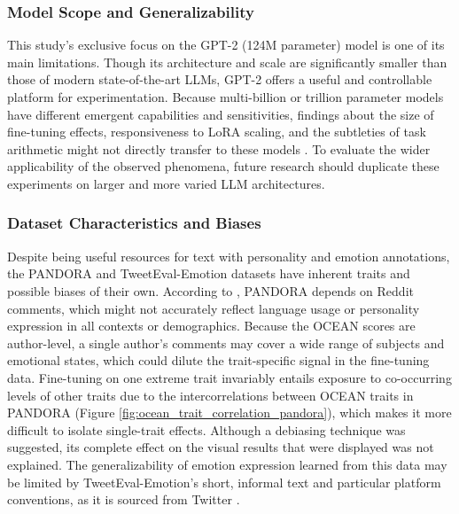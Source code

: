 \documentclass{DESSThesis}
\begin{document}
\subsubsection{Model Scope and Generalizability}
This study's exclusive focus on the GPT-2 (124M parameter) model is one of its main limitations. Though its architecture and scale are significantly smaller than those of modern state-of-the-art LLMs, GPT-2 offers a useful and controllable platform for experimentation. Because multi-billion or trillion parameter models have different emergent capabilities and sensitivities, findings about the size of fine-tuning effects, responsiveness to LoRA scaling, and the subtleties of task arithmetic might not directly transfer to these models \cite{chang_language_2023, safdari_personality_2023, bodroza_personality_2024}. To evaluate the wider applicability of the observed phenomena, future research should duplicate these experiments on larger and more varied LLM architectures.

\subsubsection{Dataset Characteristics and Biases}
Despite being useful resources for text with personality and emotion annotations, the PANDORA and TweetEval-Emotion datasets have inherent traits and possible biases of their own. According to \cite{gjaurkovic_pandora_2021}, PANDORA depends on Reddit comments, which might not accurately reflect language usage or personality expression in all contexts or demographics. Because the OCEAN scores are author-level, a single author's comments may cover a wide range of subjects and emotional states, which could dilute the trait-specific signal in the fine-tuning data. Fine-tuning on one extreme trait invariably entails exposure to co-occurring levels of other traits due to the intercorrelations between OCEAN traits in PANDORA (Figure \ref{fig:ocean_trait_correlation_pandora}), which makes it more difficult to isolate single-trait effects. Although a debiasing technique was suggested, its complete effect on the visual results that were displayed was not explained. The generalizability of emotion expression learned from this data may be limited by TweetEval-Emotion's short, informal text and particular platform conventions, as it is sourced from Twitter \cite{rosenthal_semeval-2018_2018}.
\end{document}
